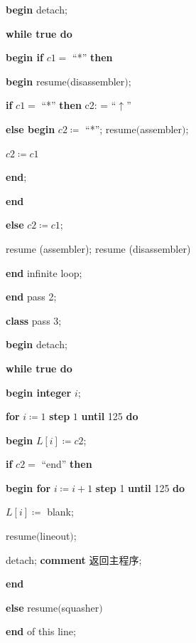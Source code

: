 \quad \textbf{begin} detach;

\quad \quad \textbf{while true do}

\quad \quad \quad \textbf{begin if} $c1 =$ ``*'' \textbf{then}

\quad \quad \quad \quad \textbf{begin} resume$($disassembler$)$;

\quad \quad \quad \quad \quad \textbf{if} $c1 =$ ``*'' \textbf{then} c2: = ``$\uparrow$''

\quad \quad \quad \quad \quad \textbf{else begin} $c2 \coloneq$ ``*''; resume$($assembler$)$;

\quad \quad \quad \quad \quad \quad $c2\coloneq c1$

\quad \quad \quad \quad \quad \textbf{end};

\quad \quad \quad \quad \textbf{end}

\quad \quad \quad \textbf{else} $c2\coloneq c1$;

\quad \quad \quad resume (assembler); resume (disassembler)

\quad \textbf{end} infinite loop;

\quad \textbf{end} pass 2;

\quad \textbf{class} pass 3;

\quad \textbf{begin} detach;

\quad \quad \textbf{while true do}

\quad \quad \quad \textbf{begin integer} $i$;

\quad \quad \quad \quad \textbf{for} $i\coloneq 1$ \textbf{step} $1$ \textbf{until} 125 \textbf{do}

\quad \quad \quad \quad \quad \textbf{begin} $L[i] \coloneq c2$;

\quad \quad \quad \quad \quad \quad \textbf{if} $c2 =$ ``end'' \textbf{then}

\quad \quad \quad \quad \quad \quad \textbf{begin for} $i\coloneq i + 1$ \textbf{step} 1 \textbf{until} 125 \textbf{do}

\quad \quad \quad \quad \quad \quad \quad $L[i] \coloneq$ blank;

\quad \quad \quad \quad \quad \quad \quad resume$($lineout$)$;

\quad \quad \quad \quad \quad \quad \quad detach; \textbf{comment} 返回主程序;

\quad \quad \quad \quad \quad \quad \textbf{end}

\quad \quad \quad \quad \quad \quad \textbf{else} resume$($squasher$)$

\quad \quad \quad \quad \quad \quad \textbf{end} of this line;


